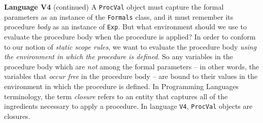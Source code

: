 \begin{minipage}[t]{\sw}
\slidenumber
\LARGE
{\bf Language V4} (continued)\exx
A \verb'ProcVal' object must capture
the formal parameters as an instance of the \verb'Formals' class,
and it must remember its procedure {\em body}
as an instance of \verb'Exp'.
But what environment should we use to evaluate the procedure body
when the procedure is applied?
In order to conform to our notion of {\em static scope rules},
we want to evaluate the procedure body
{\em using the environment in which the procedure is defined}.
So any variables in the procedure body
which are {\em not} among the formal parameters --
in other words, the variables that {\em occur free} in the procedure body --
are bound to their values in the environment
in which the procedure is defined.\exx
In Programming Languages terminology, the term {\em closure}
refers to an entity that captures all of the ingredients necessary
to apply a procedure.
In language \verb'V4',
\verb'ProcVal' objects are closures.
\end{minipage}
